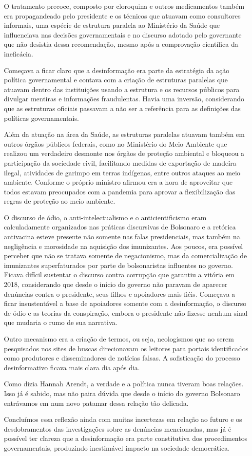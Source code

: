 O tratamento precoce, composto por cloroquina e outros medicamentos
também era propagandeado pelo presidente e os técnicos que atuavam como
consultores informais, uma espécie de estrutura paralela ao Ministério
da Saúde que influenciava nas decisões governamentais e no discurso
adotado pelo governante que não desistia dessa recomendação, mesmo após
a comprovação científica da ineficácia.

Começava a ficar claro que a desinformação era parte da estratégia da
ação política governamental e contava com a criação de estruturas
paralelas que atuavam dentro das instituições usando a estrutura e os
recursos públicos para divulgar mentiras e informações fraudulentas.
Havia uma inversão, considerando que as estruturas oficiais passavam a
não ser a referência para as definições das políticas governamentais.

Além da atuação na área da Saúde, as estruturas paralelas atuavam também
em outros órgãos públicos federais, como no Ministério do Meio Ambiente
que realizou um verdadeiro desmonte nos órgãos de proteção ambiental e
bloqueou a participação da sociedade civil, facilitando medidas de
exportação de madeira ilegal, atividades de garimpo em terras indígenas,
entre outros ataques ao meio ambiente. Conforme o próprio ministro
afirmou era a hora de aproveitar que todos estavam preocupados com a
pandemia para aprovar a flexibilização das regras de proteção ao meio
ambiente.

O discurso de ódio, o anti-intelectualismo e o anticientificismo eram
calculadamente organizados nas práticas discursivas de Bolsonaro e a
retórica antivacina esteve presente não somente nas falas presidenciais,
mas também na negligência e morosidade na aquisição dos imunizantes. Aos
poucos, era possível perceber que não se tratava somente de
negacionismo, mas da comercialização de imunizantes superfaturados por
parte de bolsonaristas influentes no governo. Ficava difícil sustentar o
discurso contra corrupção que garantiu a vitória em 2018, considerando
que desde o início do governo não paravam de aparecer denúncias contra o
presidente, seus filhos e apoiadores mais fiéis. Começava a ficar
insustentável a base de apoiadores somente com a desinformação, o
discurso de ódio e as teorias da conspiração, embora o presidente não
fizesse nenhum sinal que mudaria o rumo de sua narrativa.

Outro mecanismo era a criação de termos, ou seja, neologismos que ao
serem pesquisados nos sites de buscas direcionavam os leitores para
portais identificados como produtores e disseminadores de notícias
falsas. A sofisticação do processo desinformativo ficava mais clara dia
após dia.

Como dizia Hannah Arendt, a verdade e a política nunca tiveram boas
relações. Isso já é sabido, mas não paira dúvida que desde o início do
governo Bolsonaro entrávamos em num novo patamar dessa relação tão
delicada.

Concluímos essa reflexão ainda com muitas incertezas em relação ao
futuro e os desdobramentos das investigações sobre as denúncias
mencionadas, mas já é possível ter clareza que a desinformação era parte
constitutiva dos procedimentos governamentais, produzindo inestimável
impacto na sociedade democrática.
